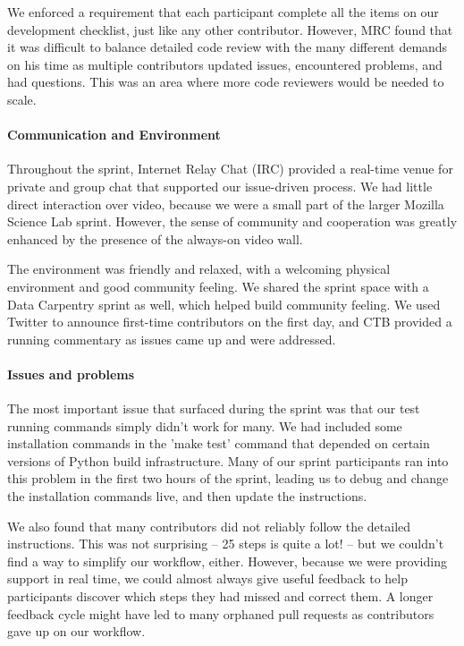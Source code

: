 \documentclass[11pt]{article}
\begin{document}
We enforced a requirement that each participant complete all the
items on our development checklist, just like any other contributor.
However, MRC found that it was difficult to balance detailed code
review with the many different demands on his time as multiple
contributors updated issues, encountered problems, and had questions.
This was an area where more code reviewers would be needed to scale.

\paragraph{Communication and Environment} Throughout the sprint, Internet Relay Chat (IRC) provided a real-time
venue for private and group chat that supported our issue-driven
process.  We had little direct interaction over video, because we were
a small part of the larger Mozilla Science Lab sprint.  However, the
sense of community and cooperation was greatly enhanced by the
presence of the always-on video wall.

The environment was friendly and relaxed, with a welcoming physical
environment and good community feeling.  We shared the sprint space
with a Data Carpentry sprint as well, which helped build community feeling.
We used Twitter to announce first-time contributors on the first day, and
CTB provided a running commentary as issues came up and were addressed.

\paragraph{Issues and problems}
The most important issue that surfaced during the sprint was that our
test running commands simply didn't work for many.  We had included
some installation commands in the 'make test' command that depended on
certain versions of Python build infrastructure.  Many of our sprint
participants ran into this problem in the first two hours of the
sprint, leading us to debug and change the installation commands live,
and then update the instructions.

We also found that many contributors did not reliably follow the
detailed instructions.  This was not surprising -- 25 steps is quite a
lot! -- but we couldn't find a way to simplify our workflow, either.
However, because we were providing support in real time, we could
almost always give useful feedback to help participants discover which
steps they had missed and correct them.  A longer feedback cycle might
have led to many orphaned pull requests as contributors gave up on our
workflow.
\end{document}
